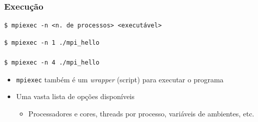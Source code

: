 \documentclass[xcolor={usenames,dvipsnames},12pt,presentation,aspectratio=169]{beamer}
\begin{document}
\begin{frame}[fragile]
  \frametitle{Execução}
  \begin{center}  
  \begin{minipage}{0.9\textwidth}
    \begin{verbatim}
$ mpiexec -n <n. de processos> <executável>
    \end{verbatim}
  \begin{verbatim}
$ mpiexec -n 1 ./mpi_hello

$ mpiexec -n 4 ./mpi_hello
  \end{verbatim}
  \end{minipage}
  \end{center}
%
\begin{itemize}
  \item \texttt{mpiexec} também é um \emph{wrapper} (script) para executar o programa
  \item Uma vasta lista de opções disponíveis
  \begin{itemize}
    \item Processadores e cores, threads por processo, variáveis de ambientes, etc.
  \end{itemize}
\end{itemize}
\end{frame}
\end{document}
